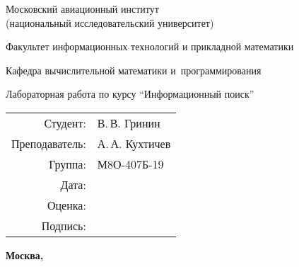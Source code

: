 \begin{titlepage}
\begin{center}
\bfseries

{\Large Московский авиационный институт\\ (национальный исследовательский университет)

}

\vspace{48pt}

{\large Факультет информационных технологий и прикладной математики
}

\vspace{36pt}

{\large Кафедра вычислительной математики и~программирования

}


\vspace{48pt}

Лабораторная работа  по курсу \enquote{Информационный поиск}

\end{center}

\vspace{72pt}

\begin{flushright}
\begin{tabular}{rl}
Студент: & В.\,В. Гринин \\
Преподаватель: & А.\,А. Кухтичев \\
Группа: & М8О-407Б-19 \\
Дата: & \\
Оценка: & \\
Подпись: & \\
\end{tabular}
\end{flushright}

\vfill

\begin{center}
\bfseries
Москва, \the\year
\end{center}
\end{titlepage}

\pagebreak
